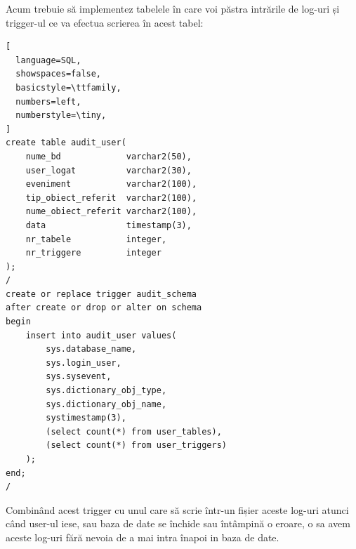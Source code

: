 \documentclass[12pt]{article}
\begin{document}
\vspace{0.5em}

Acum trebuie să implementez tabelele în care voi păstra intrările de log-uri și trigger-ul ce va
efectua scrierea în acest tabel:

\vspace{0.5em}

\begin{lstlisting}[
  language=SQL,
  showspaces=false,
  basicstyle=\ttfamily,
  numbers=left,
  numberstyle=\tiny,
]
create table audit_user(
    nume_bd             varchar2(50),
    user_logat          varchar2(30),
    eveniment           varchar2(100),
    tip_obiect_referit  varchar2(100),
    nume_obiect_referit varchar2(100),
    data                timestamp(3),
    nr_tabele           integer,
    nr_triggere         integer
);
/
create or replace trigger audit_schema
after create or drop or alter on schema
begin
    insert into audit_user values(
        sys.database_name,
        sys.login_user,
        sys.sysevent,
        sys.dictionary_obj_type,
        sys.dictionary_obj_name,
        systimestamp(3),
        (select count(*) from user_tables),
        (select count(*) from user_triggers)
    );
end;
/
\end{lstlisting}

\vspace{0.5em}

Combinând acest trigger cu unul care să scrie într-un fișier aceste log-uri
atunci când user-ul iese, sau baza de date se închide sau întâmpină o
eroare, o sa avem aceste log-uri fără nevoia de a mai intra înapoi in baza
de date.

\vspace{0.5em}
\end{document}
